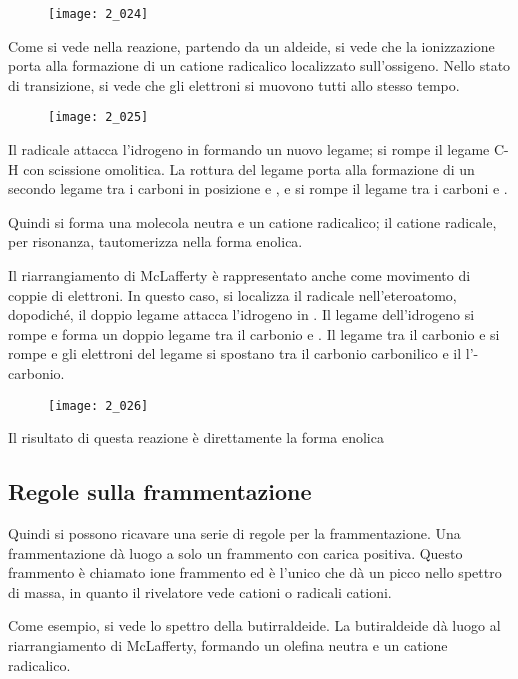 \begin{figure}[H]
  \texttt{[image: 2\_024]}
\end{figure}

Come si vede nella reazione, partendo da un aldeide, si vede che la
ionizzazione porta alla formazione di un catione radicalico localizzato
sull'ossigeno. Nello stato di transizione, si vede che gli elettroni si
muovono tutti allo stesso tempo.

\begin{figure}[H]
  \texttt{[image: 2\_025]}
\end{figure}

Il radicale attacca l'idrogeno in \gamma{} formando un nuovo legame; si
rompe il legame C-H con scissione omolitica. La rottura del legame porta
alla formazione di un secondo legame tra i carboni in posizione \beta{}
e \gamma{}, e si rompe il legame tra i carboni \alpha{} e \beta{}.

Quindi si forma una molecola neutra e un catione radicalico; il catione
radicale, per risonanza, tautomerizza nella forma enolica.

Il riarrangiamento di McLafferty è rappresentato anche come movimento di
coppie di elettroni. In questo caso, si localizza il radicale
nell'eteroatomo, dopodiché, il doppio legame attacca l'idrogeno in
\gamma{}. Il legame dell'idrogeno si rompe e forma un doppio legame tra
il carbonio \beta{} e \gamma{}. Il legame tra il carbonio \alpha{} e
\beta{} si rompe e gli elettroni del legame si spostano tra il carbonio
carbonilico e il l'\alpha-carbonio.

\begin{figure}[H]
  \texttt{[image: 2\_026]}
\end{figure}

Il risultato di questa reazione è direttamente la forma enolica

\subsection{Regole sulla frammentazione}

Quindi si possono ricavare una serie di regole per la frammentazione.
Una frammentazione dà luogo a solo un frammento con carica positiva.
Questo frammento è chiamato ione frammento ed è l'unico che dà un picco
nello spettro di massa, in quanto il rivelatore vede cationi o radicali
cationi.

Come esempio, si vede lo spettro della butirraldeide. La butiraldeide dà
luogo al riarrangiamento di McLafferty, formando un olefina neutra e un
catione radicalico.

